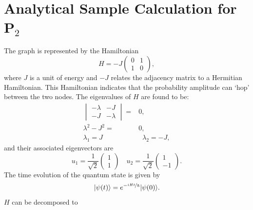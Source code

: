 \documentclass[reprint, aps, 12pt, floatfix]{revtex4-2}
\begin{document}
\section{Analytical Sample Calculation for P$_2$}
\begin{center}
\end{center}
The graph is represented by the Hamiltonian
\begin{equation}
    H=-J\begin{pmatrix}
        0&1\\
        1&0
    \end{pmatrix},
\end{equation}
where $J$ is a unit of energy and $-J$ relates the adjacency matrix to a Hermitian Hamiltonian.
This Hamiltonian indicates that the probability amplitude can `hop' between the two nodes.
The eigenvalues of $H$ are found to be:
\begin{align}
    \begin{vmatrix}
        -\lambda&-J\\
        -J&-\lambda
    \end{vmatrix}=&0,\nonumber\\
    \lambda^2-J^2=&0,\nonumber\\
    \lambda_1=J\;\;&\;\;\lambda_2=-J,
\end{align}
and their associated eigenvectors are
\begin{equation}
    u_1=\frac{1}{\sqrt{2}}\begin{pmatrix}
        1\\
        1
    \end{pmatrix}\quad u_2=\frac{1}{\sqrt{2}}\begin{pmatrix}
        1\\
        -1
    \end{pmatrix}.
\end{equation}
The time evolution of the quantum state is given by
\begin{equation}
    \label{eq:evolution}
    |\psi(t)\rangle=e^{-\nicefrac{iHt}{\hbar}}|\psi(0)\rangle.
\end{equation}
$H$ can be decomposed to
\end{document}
